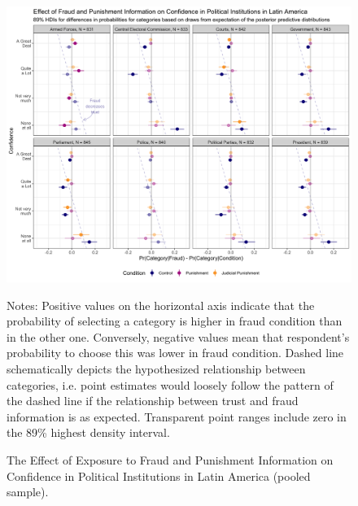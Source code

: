 \documentclass[11pt, ngerman,english,a4]{article}
\begin{document}
\begin{figure}[H]
    \centering
    \includegraphics[width=\linewidth,trim=4 4 4 4,clip]{figs/la_hdi89.png}\\
    \caption{The Effect of Exposure to Fraud and Punishment Information on Confidence in Political Institutions in Latin America (pooled sample).}
    \singlespacing
    \raggedright
    \footnotesize{Notes: Positive values on the horizontal axis indicate that the probability of selecting a category is higher in fraud condition than in the other one. Conversely, negative values mean that respondent's probability to choose this was lower in fraud condition. Dashed line schematically depicts the hypothesized relationship between categories, i.e. point estimates would loosely follow the pattern of the dashed line if the relationship between trust and fraud information is as expected. Transparent point ranges include zero in the 89\% highest density interval.}   
    \label{fig:main-la}
\end{figure}
\end{document}
